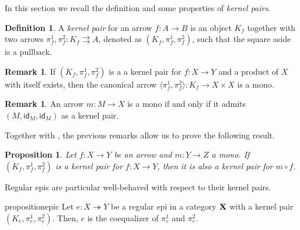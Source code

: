 \documentclass[a4paper,UKenglish,cleveref,pdftex,amsthm,thm-restate,numberwithinsect]{cas-sc}
\theoremstyle{plain}
\newtheorem{proposition}[theorem]{Proposition}
\theoremstyle{definition}
\newtheorem{definition}[theorem]{Definition}
\newtheorem{remark}[theorem]{Remark}
\def\X{\textbf {\textup{X}}}
\newcommand{\eto}{\twoheadrightarrow}
\newcommand{\id}[1]{\mathsf{id}_{#1}}
\begin{document}
In this section we recall the definition and some properties of \emph{kernel pairs}.

\noindent 
\parbox{11cm}{
\begin{definition}
    A \emph{kernel pair} for an arrow $f\colon A \to B$ is an object $K_f$ together with two arrows $\pi^1_f, \pi^2_f\colon K_f \rightrightarrows A$, denoted as $(K_f, \pi^1_f, \pi^2_f)$, such that the square aside is a pullback.
\end{definition}}\hfill 
\parbox{2cm}{}

\smallskip
\begin{remark}\label{prop:pairng_of_kernel_pairs_mono}
If $(K_f, \pi^1_f, \pi^2_f)$ is a a kernel pair for $f\colon X \to Y$ and a product of $X$ with itself exists, then the canonical arrow $\langle \pi^1_f, \pi^2_f\rangle \colon K_f \to X \times X$ is a mono.
\end{remark}

\begin{remark}\label{prop:kermono}
An arrow $m\colon M\to X$ is a mono if and only if it admits $(M, \id{M}, \id{M})$ as a kernel pair.
\end{remark}

Together with , the previous remarks allow us to prove the following result.

\begin{proposition}\label{cor:kermono}
	Let $f\colon X\to Y$ be an arrow and $m\colon Y\to Z$ a mono. If
	$(K_f, \pi_f^1, \pi_f^2)$ is a kernel pair for $f\colon X\to Y$, then it is also a kernel pair for $m\circ f$.
\end{proposition}

Regular epis are particular well-behaved with respect to their kernel pairs.

\begin{restatable}{proposition}{epic}\label{prop:reg_epi_coeq}
    Let $e\colon X \eto Y$ be a regular epi in a category $\X$ with a kernel pair $(K_e, \pi^1_e, \pi^2_e)$. Then, $e$ is the coequalizer of $\pi^1_e$ and $\pi^2_e$.
\end{restatable}
\end{document}
